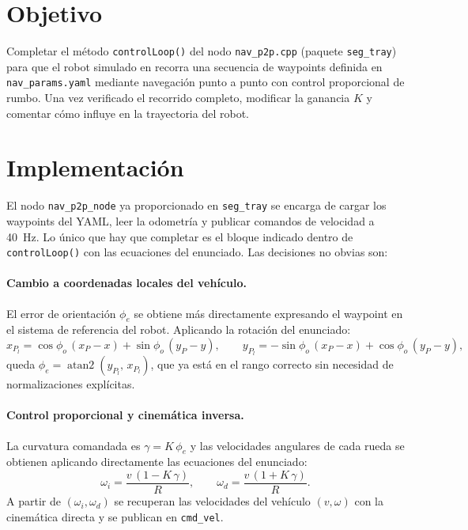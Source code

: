 \section{Objetivo}
Completar el m\'{e}todo \texttt{controlLoop()} del nodo \texttt{nav\_p2p.cpp} (paquete \texttt{seg\_tray}) para que el robot \pioneer{} simulado en \coppelia{} recorra una secuencia de waypoints definida en \texttt{nav\_params.yaml} mediante navegaci\'{o}n punto a punto con control proporcional de rumbo. Una vez verificado el recorrido completo, modificar la ganancia $K$ y comentar c\'{o}mo influye en la trayectoria del robot.


\section{Implementaci\'{o}n}

El nodo \texttt{nav\_p2p\_node} ya proporcionado en \texttt{seg\_tray} se encarga de cargar los waypoints del YAML, leer la odometr\'{i}a y publicar comandos de velocidad a 40~Hz. Lo \'{u}nico que hay que completar es el bloque indicado dentro de \texttt{controlLoop()} con las ecuaciones del enunciado. Las decisiones no obvias son:

\paragraph{Cambio a coordenadas locales del veh\'{i}culo.} El error de orientaci\'{o}n $\phi_e$ se obtiene m\'{a}s directamente expresando el waypoint en el sistema de referencia del robot. Aplicando la rotaci\'{o}n del enunciado:
\begin{equation*}
  x_{P_l} = \cos\phi_o\,(x_P - x) + \sin\phi_o\,(y_P - y), \qquad
  y_{P_l} = -\sin\phi_o\,(x_P - x) + \cos\phi_o\,(y_P - y),
\end{equation*}
queda $\phi_e = \operatorname{atan2}(y_{P_l},\, x_{P_l})$, que ya est\'{a} en el rango correcto sin necesidad de normalizaciones expl\'{i}citas.

\paragraph{Control proporcional y cinem\'{a}tica inversa.} La curvatura comandada es $\gamma = K\,\phi_e$ y las velocidades angulares de cada rueda se obtienen aplicando directamente las ecuaciones del enunciado:
\begin{equation*}
  \omega_i = \frac{v\,(1 - K\,\gamma)}{R}, \qquad
  \omega_d = \frac{v\,(1 + K\,\gamma)}{R}.
\end{equation*}
A partir de $(\omega_i, \omega_d)$ se recuperan las velocidades del veh\'{i}culo $(v, \omega)$ con la cinem\'{a}tica directa y se publican en \texttt{cmd\_vel}.

